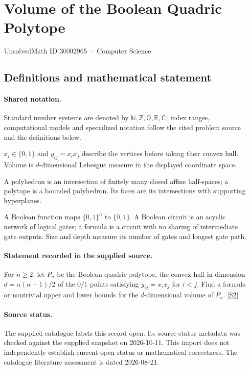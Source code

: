 \documentclass[11pt]{article}
\newcommand{\sref}[2]{\hyperlink{source:#1:#2}{[S#2]}}
\begin{document}
\setcounter{section}{30002964}
\section{Volume of the Boolean Quadric Polytope}\label{30002965}
{\small\sffamily UnsolvedMath ID 30002965 · Computer Science}
\subsection{Definitions and mathematical statement}

\paragraph{Shared notation.}Standard number systems are denoted by $\mathbb N,\mathbb Z,\mathbb Q,\mathbb R,\mathbb C$; index ranges, computational models and specialized notation follow the cited problem source and the definitions below.


$x_i\in\{0,1\}$ and $y_{ij}=x_ix_j$ describe the vertices before taking their convex hull. Volume is $d$-dimensional Lebesgue measure in the displayed coordinate space.

A polyhedron is an intersection of finitely many closed affine half-spaces; a polytope is a bounded polyhedron. Its faces are its intersections with supporting hyperplanes.

A Boolean function maps $\{0,1\}^n$ to $\{0,1\}$. A Boolean circuit is an acyclic network of logical gates; a formula is a circuit with no sharing of intermediate gate outputs. Size and depth measure its number of gates and longest gate path.
\paragraph{Statement recorded in the supplied source.}
For $n\geq2$, let $P_n$ be the Boolean quadric polytope, the convex hull in dimension $d=n(n+1)/2$ of the $0/1$ points satisfying $y_{ij}=x_ix_j$ for $i<j$. Find a formula or nontrivial upper and lower bounds for the $d$-dimensional volume of $P_n$. \sref{30002965}{2}
\paragraph{Source status.}
The supplied catalogue labels this record open. Its source-status metadata was checked against the supplied snapshot on 2026-10-11. This import does not independently establish current open status or mathematical correctness. The catalogue literature assessment is dated 2026-08-21.
\end{document}

